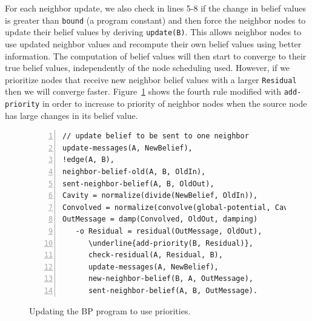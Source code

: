 For each neighbor update, we also check in lines 5-8 if the change in belief
values is greater than \texttt{bound} (a program constant) and then force the
neighbor nodes to update their belief values by deriving \texttt{update(B)}.
This allows neighbor nodes to use updated neighbor values and recompute their
own belief values using better information. The computation of belief values
will then start to converge to their true belief values, independently of the
node scheduling used. However, if we prioritize nodes that receive new neighbor
belief values with a larger \texttt{Residual} then we will converge faster.
Figure~\ref{code:coordination:improved_bp} shows the fourth rule modified with
\texttt{add-priority} in order to increase to priority of neighbor nodes when
the source node has large changes in its belief value.

\begin{figure}[h!]
\begin{Verbatim}[numbers=left,commandchars=\\\{\},fontsize=\scriptsize]
// update belief to be sent to one neighbor
update-messages(A, NewBelief),
!edge(A, B),
neighbor-belief-old(A, B, OldIn),
sent-neighbor-belief(A, B, OldOut),
Cavity = normalize(divide(NewBelief, OldIn)),
Convolved = normalize(convolve(global-potential, Cavity)),
OutMessage = damp(Convolved, OldOut, damping)
   -o Residual = residual(OutMessage, OldOut),
      \underline{add-priority(B, Residual)},
      check-residual(A, Residual, B),
      update-messages(A, NewBelief),
      new-neighbor-belief(B, A, OutMessage),
      sent-neighbor-belief(A, B, OutMessage).
\end{Verbatim}
\caption{Updating the BP program to use priorities.}
\label{code:coordination:improved_bp}
\end{figure}
